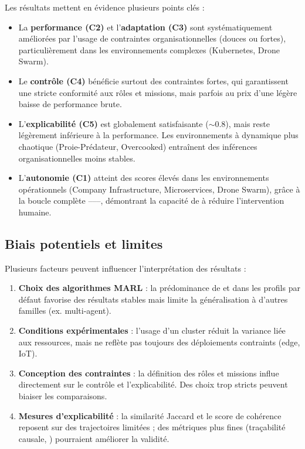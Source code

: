 Les résultats mettent en évidence plusieurs points clés :
\begin{itemize}
  \item La \textbf{performance (C2)} et l’\textbf{adaptation (C3)} sont systématiquement améliorées par l’usage de contraintes organisationnelles (douces ou fortes), particulièrement dans les environnements complexes (Kubernetes, Drone Swarm).
  \item Le \textbf{contrôle (C4)} bénéficie surtout des contraintes fortes, qui garantissent une stricte conformité aux rôles et missions, mais parfois au prix d’une légère baisse de performance brute.
  \item L’\textbf{explicabilité (C5)} est globalement satisfaisante ($\sim 0.8$), mais reste légèrement inférieure à la performance. Les environnements à dynamique plus chaotique (Proie-Prédateur, Overcooked) entraînent des inférences organisationnelles moins stables.
  \item L’\textbf{autonomie (C1)} atteint des scores élevés dans les environnements opérationnels (Company Infrastructure, Microservices, Drone Swarm), grâce à la boucle complète –––, démontrant la capacité de  à réduire l’intervention humaine.
\end{itemize}

\subsection{Biais potentiels et limites}

Plusieurs facteurs peuvent influencer l’interprétation des résultats :
\begin{enumerate}[label={\alph*)}]
  \item \textbf{Choix des algorithmes MARL} : la prédominance de  et  dans les profils par défaut favorise des résultats stables mais limite la généralisation à d’autres familles (ex.  multi-agent).
  \item \textbf{Conditions expérimentales} : l’usage d’un cluster  réduit la variance liée aux ressources, mais ne reflète pas toujours des déploiements contraints (edge, IoT).
  \item \textbf{Conception des contraintes} : la définition des rôles et missions influe directement sur le contrôle et l’explicabilité. Des choix trop stricts peuvent biaiser les comparaisons.
  \item \textbf{Mesures d’explicabilité} : la similarité Jaccard et le score de cohérence reposent sur des trajectoires limitées ; des métriques plus fines (traçabilité causale, ) pourraient améliorer la validité.
\end{enumerate}

